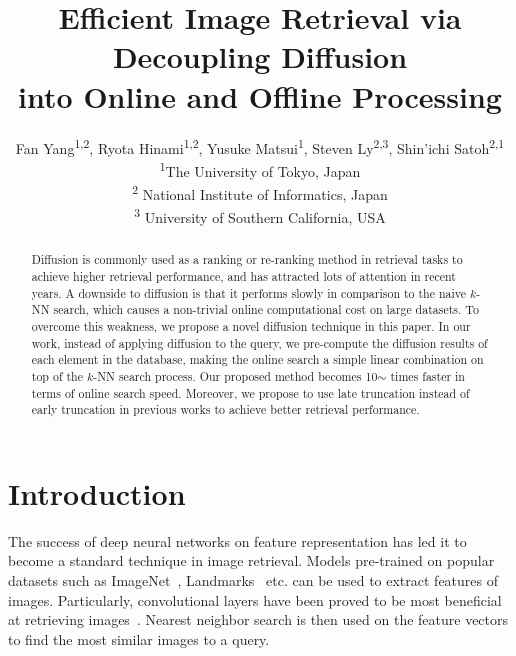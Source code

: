 \documentclass[letterpaper]{article} \usepackage{aaai19}  \usepackage{times}  \usepackage{helvet}  \usepackage{courier}  \usepackage{url}  \usepackage{graphicx}  \frenchspacing  \setlength{\pdfpagewidth}{8.5in}  \setlength{\pdfpageheight}{11in}
\begin{document}
\title{Efficient Image Retrieval via Decoupling Diffusion \\ into Online and Offline Processing}
\author{Fan Yang\textsuperscript{1,2}, Ryota Hinami\textsuperscript{1,2}, Yusuke Matsui\textsuperscript{1}, Steven Ly\textsuperscript{2,3}, Shin'ichi Satoh\textsuperscript{2,1} \\
\textsuperscript{1}The University of Tokyo, Japan \\
\textsuperscript{2} National Institute of Informatics, Japan \\
\textsuperscript{3} University of Southern California, USA
}

\maketitle
\begin{abstract}
Diffusion is commonly used as a ranking or re-ranking method in retrieval tasks to achieve higher retrieval performance, and has attracted lots of attention in recent years.
A downside to diffusion is that it performs slowly in comparison to the naive $k$-NN search, which causes a non-trivial online computational cost on large datasets.
To overcome this weakness, we propose a novel diffusion technique in this paper.
In our work, instead of applying diffusion to the query, we pre-compute the diffusion results of each element in the database, making the online search a simple linear combination on top of the $k$-NN search process.
Our proposed method becomes 10$\sim$ times faster in terms of online search speed.
Moreover, we propose to use late truncation instead of early truncation in previous works to achieve better retrieval performance.
\end{abstract}


\section{Introduction}

The success of deep neural networks on feature representation has led it to become a standard technique in image retrieval.
Models pre-trained on popular datasets such as ImageNet~\cite{deng2009imagenet}, Landmarks~\cite{babenko2014neural} etc. can be used to extract features of images.
Particularly, convolutional layers have been proved to be most beneficial at retrieving images~\cite{babenko2014neural,radenovic2016cnn,gordo2016deep,razavian2016visual}.
Nearest neighbor search is then used on the feature vectors to find the most similar images to a query.
\end{document}
